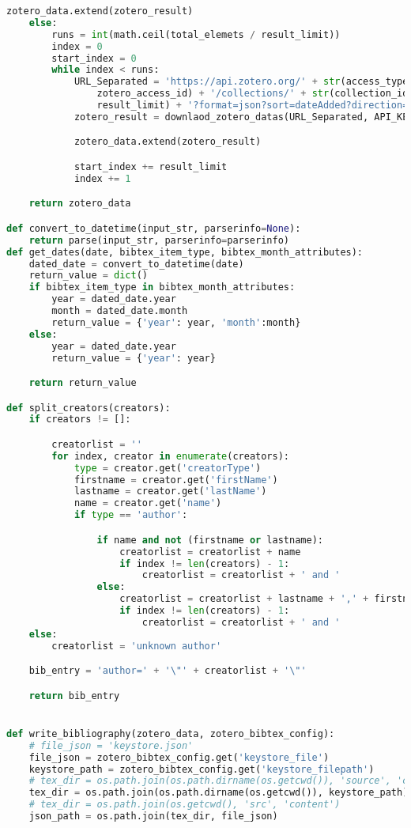 \begin{lstlisting}[language=python, caption=Python LaTex - zotero - Zotero BibLaTex Importer,captionpos=b,label={lst:zotero},breaklines=true]
        zotero_data.extend(zotero_result)
    else:
        runs = int(math.ceil(total_elemets / result_limit))
        index = 0
        start_index = 0
        while index < runs:
            URL_Separated = 'https://api.zotero.org/' + str(access_type) + '/' + str(
                zotero_access_id) + '/collections/' + str(collection_id) + '/items?limit=' + str(
                result_limit) + '?format=json?sort=dateAdded?direction=asc' + '&start=' + str(start_index)
            zotero_result = downlaod_zotero_datas(URL_Separated, API_KEY)

            zotero_data.extend(zotero_result)

            start_index += result_limit
            index += 1

    return zotero_data

def convert_to_datetime(input_str, parserinfo=None):
    return parse(input_str, parserinfo=parserinfo)
def get_dates(date, bibtex_item_type, bibtex_month_attributes):
    dated_date = convert_to_datetime(date)
    return_value = dict()
    if bibtex_item_type in bibtex_month_attributes:
        year = dated_date.year
        month = dated_date.month
        return_value = {'year': year, 'month':month}
    else:
        year = dated_date.year
        return_value = {'year': year}

    return return_value

def split_creators(creators):
    if creators != []:

        creatorlist = ''
        for index, creator in enumerate(creators):
            type = creator.get('creatorType')
            firstname = creator.get('firstName')
            lastname = creator.get('lastName')
            name = creator.get('name')
            if type == 'author':

                if name and not (firstname or lastname):
                    creatorlist = creatorlist + name
                    if index != len(creators) - 1:
                        creatorlist = creatorlist + ' and '
                else:
                    creatorlist = creatorlist + lastname + ',' + firstname
                    if index != len(creators) - 1:
                        creatorlist = creatorlist + ' and '
    else:
        creatorlist = 'unknown author'

    bib_entry = 'author=' + '\"' + creatorlist + '\"'

    return bib_entry


def write_bibliography(zotero_data, zotero_bibtex_config):
    # file_json = 'keystore.json'
    file_json = zotero_bibtex_config.get('keystore_file')
    keystore_path = zotero_bibtex_config.get('keystore_filepath')
    # tex_dir = os.path.join(os.path.dirname(os.getcwd()), 'source', 'configuration')
    tex_dir = os.path.join(os.path.dirname(os.getcwd()), keystore_path)
    # tex_dir = os.path.join(os.getcwd(), 'src', 'content')
    json_path = os.path.join(tex_dir, file_json)


\end{lstlisting}

